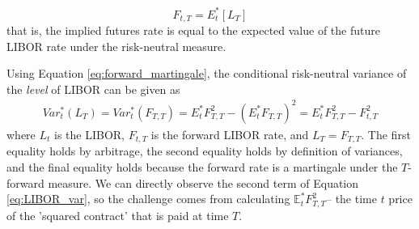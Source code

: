 \documentclass[11pt]{article}
\begin{document}
\begin{equation}
F_{t, T} = E_{t}^{*}\left[L_{T}\right]
\label{eq:forward_martingale}
\end{equation}
that is, the implied futures rate is equal to the expected value of the future LIBOR rate under the risk-neutral measure.

Using Equation \ref{eq:forward_martingale}, the conditional risk-neutral variance of the \textit{level} of LIBOR can be given as
\begin{equation}
\begin{split}
Var_{t}^{*}(L_{T}) = Var_{t}^{*}(F_{T, T})= E_{t}^{*}F_{T, T}^{2}-(E_{t}^{*}F_{T, T})^{2}=E_{t}^{*}F_{T, T}^{2} - F_{t, T}^{2}
\end{split}
\label{eq:LIBOR_var}
\end{equation}
where $L_{t}$ is the LIBOR, $F_{t, T}$ is the forward LIBOR rate, and $L_{T} = F_{T, T}$. The first equality holds by arbitrage, the second equality holds by definition of variances, and the final equality holds because the forward rate is a martingale under the $T$-forward measure. We can directly observe the second term of Equation \ref{eq:LIBOR_var}, so the challenge comes from calculating $\mathbb{E}_{t}^{*}F_{T, T}^{2}$-- the time $t$ price of the 'squared contract' that is paid at time $T$. 
\end{document}
